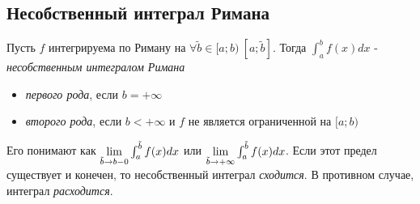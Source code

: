 \subsection{Несобственный интеграл Римана}

\begin{definition}
	Пусть $f$ интегрируема по Риману на $\forall \tilde{b} \in [a; b)\ [a; \tilde{b}]$. Тогда $\int_a^b f(x)dx$ - \textit{несобственным интегралом Римана}
	\begin{itemize}
		\item \textit{первого рода}, если $b = +\infty$
		
		\item \textit{второго рода}, если $b < +\infty$ и $f$ не является ограниченной на $[a; b)$
	\end{itemize}
	Его понимают как $\lim\limits_{\tilde{b} \to b-0} \int_a^{\tilde{b}} f(x)dx$ или $\lim\limits_{\tilde{b} \to +\infty} \int_a^{\tilde{b}} f(x)dx$. Если этот предел существует и конечен, то несобственный интеграл \textit{сходится}. В противном случае, интеграл \textit{расходится}.
\end{definition}